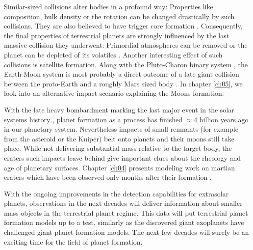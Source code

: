 Similar-sized collisions alter bodies in a profound way: Properties like composition, bulk density \citep{Benz:1988p3336} or the rotation can be changed drastically by such collisions. They are also believed to have trigger core formation \citep{1992Icar..100..326T}. Consequently, the final properties of terrestrial planets are strongly influenced by the last massive collision they underwent: Primordial atmospheres can be removed \citep{2002DPS....34.2804A} or the planet can be depleted of its volatiles \citep{2001E&PSL.192..545H}. Another interesting effect of such collisions is satellite formation. Along with the Pluto-Charon binary system \citep{Canup:2005p1987}, the Earth-Moon system is most probably a direct outcome of a late giant collision between the proto-Earth and a roughly Mars sized body \citep{1975Icar...24..504H, 1976LPI.....7..120C, 1987Icar...71...30B, Canup:2001p1861}. In chapter \ref{ch05}, we look into an alternative impact scenario explaining the Moons formation.

With the late heavy bombardment marking the last major event in the solar systems history \citep{2005Natur.435..466G}, planet formation as a process has finished $\approx 4$ billion years ago in our planetary system. Nevertheless impacts of small remnants (for example from the asteroid or the Kuiper) belt onto planets and their moons still take place. While not delivering substantial mass relative to the target body, the craters such impacts leave behind give important clues about the rheology and age of planetary surfaces. Chapter \ref{ch04} presents modeling work on martian craters which have been observed only months after their formation \cite{2009Sci...325.1674B}. 

With the ongoing improvements in the detection capabilities for extrasolar planets, observations in the next decades will deliver information about smaller mass objects in the terrestrial planet regime. This data will put terrestrial planet formation models up to a test, similarly as the discovered giant exoplanets have challenged giant planet formation models. The next few decades will surely be an exciting time for the field of planet formation.


